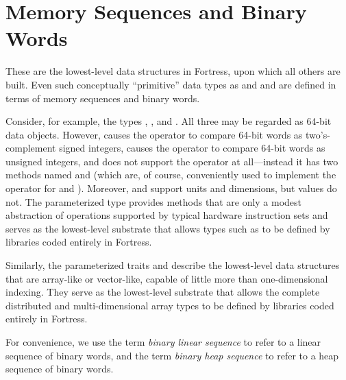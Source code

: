 %
%
%
%

\chapter{Memory Sequences and Binary Words}

These are the lowest-level data structures in Fortress, upon which
all others are built.  Even such conceptually ``primitive'' data
types as  and  and 
are defined in terms of memory sequences and binary words.

Consider, for example, the types ,
, and .  All three may be regarded
as 64-bit data objects.  However,  causes the operator
\EXP{<} to compare 64-bit words as two's-complement signed integers,
 causes the operator \EXP{<}
to compare 64-bit words as unsigned integers,
and  does not support
the operator \EXP{<} at all---instead it has two methods named 
and  (which are, of course, conveniently used to implement the
operator \EXP{<} for  and ).
Moreover,  and  support units and dimensions,
but  values do not.  The parameterized type  provides methods that are
only a modest abstraction of operations supported by typical hardware instruction sets
and serves as the lowest-level substrate that allows types such as 
to be defined by libraries coded entirely in Fortress.

Similarly, the parameterized traits  and 
describe the lowest-level data structures that are array-like or vector-like,
capable of little more than one-dimensional indexing.  They serve as the
lowest-level substrate that allows the complete distributed and multi-dimensional
array types to be defined by libraries coded entirely in Fortress.

For convenience, we use the term \emph{binary linear sequence} to refer to
a linear sequence of binary words, and the term \emph{binary heap sequence}
to refer to a heap sequence of binary words.

